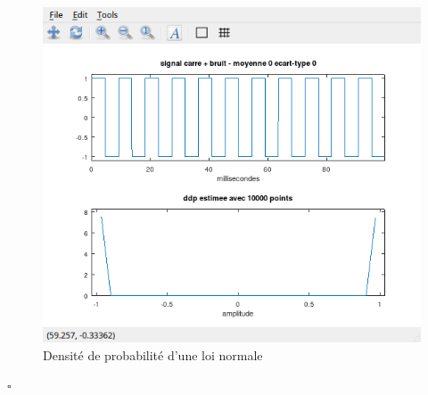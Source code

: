 \documentclass{article}
\newcommand{\finrep}{\vspace*{5mm}\hfill $\square$\color{black}\vspace*{5mm}}
\begin{document}
\begin{figure} [H]
    \centering
    \includegraphics[width=\columnwidth]{Part3-2.png}
    \caption{Densité de probabilité d'une loi normale}
\end{figure}

\finrep
\end{document}
